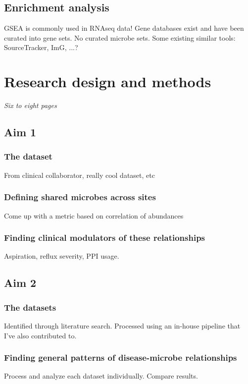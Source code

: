 \documentclass[12pt]{report}
\begin{document}
\subsection*{Enrichment analysis}
GSEA is commonly used in RNAseq data! Gene databases exist and have been curated into gene sets.
No curated microbe sets. Some existing similar tools: SourceTracker, ImG, ...?

\section*{Research design and methods}
\textit{Six to eight pages}
\subsection*{Aim 1}

\subsubsection*{The dataset}
From clinical collaborator, really cool dataset, etc

\subsubsection{Defining shared microbes across sites}
Come up with a metric based on correlation of abundances

\subsubsection{Finding clinical modulators of these relationships}
Aspiration, reflux severity, PPI usage.

\subsection*{Aim 2}

\subsubsection*{The datasets}
Identified through literature search.
Processed using an in-house pipeline that I've also contributed to.

\subsubsection*{Finding general patterns of disease-microbe relationships}
Process and analyze each dataset individually. Compare results.
\end{document}
